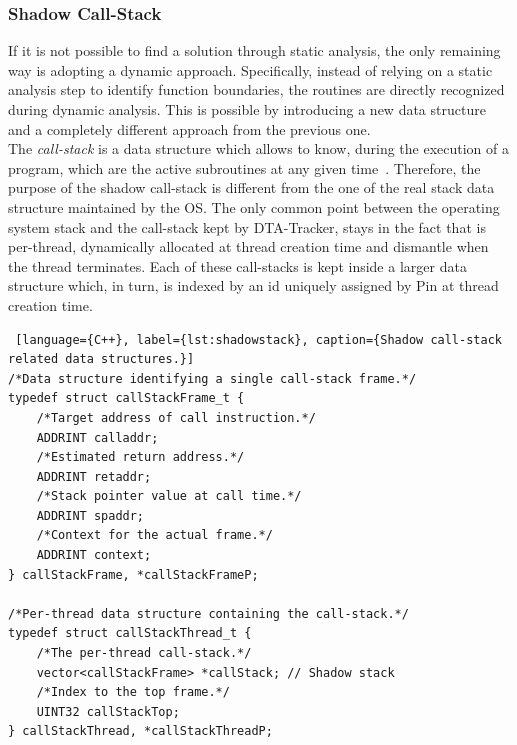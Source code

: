 \documentclass[LaM,binding=0.6cm]{sapthesis}
\begin{document}
\subsubsection{Shadow Call-Stack}
If it is not possible to find a solution through static analysis, the only remaining way is adopting a dynamic approach. Specifically, instead of relying on a static analysis step to identify function boundaries, the routines are directly recognized during dynamic analysis. This is possible by introducing a new data structure and a completely different approach from the previous one.\\

The \textit{call-stack} is a data structure which allows to know, during the execution of a program, which are the active subroutines at any given time~\cite{de2018now}. Therefore, the purpose of the shadow call-stack is different from the one of the real stack data structure maintained by the OS. The only common point between the operating system stack and the call-stack kept by DTA-Tracker, stays in the fact that is per-thread, dynamically allocated at thread creation time and dismantle when the thread terminates. Each of these call-stacks is kept inside a larger data structure which, in turn, is indexed by an id uniquely assigned by Pin at thread creation time.

\begin{lstlisting} [language={C++}, label={lst:shadowstack}, caption={Shadow call-stack related data structures.}]
/*Data structure identifying a single call-stack frame.*/
typedef struct callStackFrame_t {
	/*Target address of call instruction.*/
	ADDRINT calladdr; 
	/*Estimated return address.*/
	ADDRINT retaddr;
	/*Stack pointer value at call time.*/
	ADDRINT spaddr;
	/*Context for the actual frame.*/
	ADDRINT context;
} callStackFrame, *callStackFrameP;

/*Per-thread data structure containing the call-stack.*/
typedef struct callStackThread_t {
	/*The per-thread call-stack.*/
	vector<callStackFrame> *callStack; // Shadow stack
	/*Index to the top frame.*/
	UINT32 callStackTop;
} callStackThread, *callStackThreadP;
\end{lstlisting}
\end{document}
